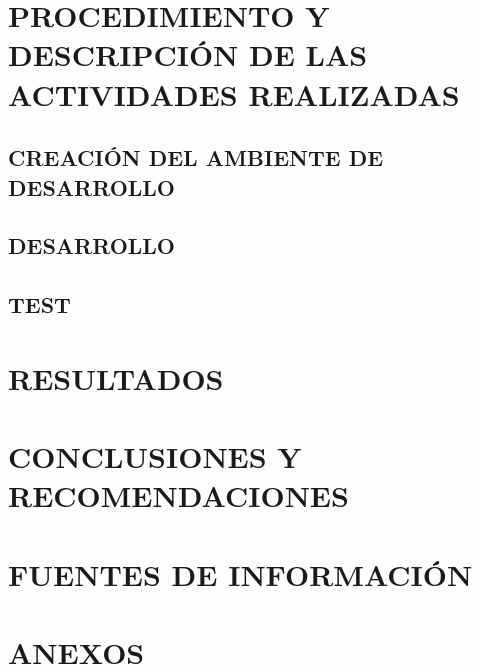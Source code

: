 \documentclass[a4paper,12pt]{report}
\begin{document}
		\chapter {PROCEDIMIENTO Y DESCRIPCIÓN DE LAS ACTIVIDADES REALIZADAS}
			
			
			\section {CREACIÓN DEL AMBIENTE DE DESARROLLO}
				
				
			\section {DESARROLLO}
				
				
			\section {TEST }
				
			
		
		\chapter {RESULTADOS}
		
		\chapter {CONCLUSIONES Y RECOMENDACIONES}
		
		\chapter {FUENTES DE INFORMACIÓN}
			
			
		\chapter {ANEXOS}
\end{document}
